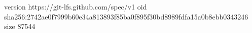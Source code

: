 version https://git-lfs.github.com/spec/v1
oid sha256:2742ae0f7999b60e34a813893f85ba0f895f30bd8989fdfa15a0b8ebb0343246
size 87544
